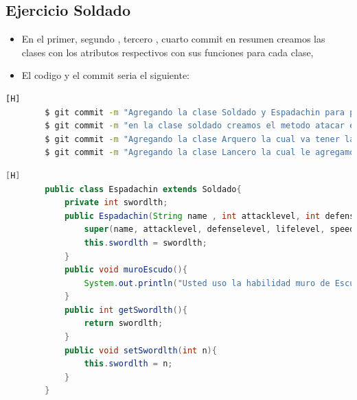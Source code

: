 \documentclass{article}
\begin{document}
	\subsection{Ejercicio Soldado}
	\begin{itemize}	
		\item En el primer, segundo , tercero , cuarto commit en resumen creamos las clases con los atributos respectivos con sus funciones para cada clase,
		\item El codigo y el commit seria el siguiente:
	\end{itemize}	
	\begin{lstlisting}[language=bash,caption={Commit}][H]
		$ git commit -m "Agregando la clase Soldado y Espadachin para poder hacer el juego bueno solo en la clase espadachin usamos la herencia que nos deja la clase Soldado y tambien creamos la funcion muroEscudo() la cual devuelve como mensaje el uso de esta habilidad defensiva y los getters y setters"
		$ git commit -m "en la clase soldado creamos el metodo atacar el cual permite al caballero realizar esta funcion cuando este use su modo montar o desmontar y para que este embista y tambien creamos los getters de Caballero el cual es solo devuelve el tipo de arma que este usando"
		$ git commit -m "Agregando la clase Arquero la cual va tener la funcion de disparar y usar la cantidad de flechas dependiendo del numero de estas va a poder atacar y tambien agregamos los getters y setters respectivos"
		$ git commit -m "Agregando la clase Lancero la cual le agregamos su atributo principal que lancelth y su funcion schiltrom y tambien sus getters and setters"
	\end{lstlisting}	
	\begin{lstlisting}[language=java,caption={Las lineas de codigos de la clase Espadachin creada:}][H]
		public class Espadachin extends Soldado{
			private int swordlth;
			public Espadachin(String name , int attacklevel, int defenselevel, int lifelevel, int speed, String attitude ,boolean lives, int row, String column, int swordlth){
				super(name, attacklevel, defenselevel, lifelevel, speed, attitude, lives, row, column);
				this.swordlth = swordlth;
			}
			public void muroEscudo(){
				System.out.println("Usted uso la habilidad muro de Escudos");
			}
			public int getSwordlth(){
				return swordlth;
			}
			public void setSwordlth(int n){
				this.swordlth = n;
			}
		}
	\end{lstlisting}
\end{document}
